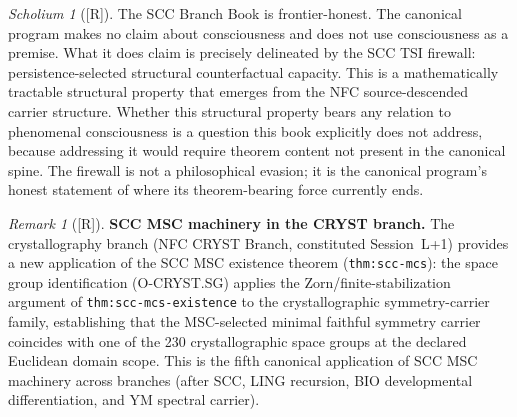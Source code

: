 \documentclass[12pt,oneside]{amsbook}
\theoremstyle{plain}
\theoremstyle{definition}
\theoremstyle{remark}
\newtheorem{remark}[theorem]{Remark}
\newtheorem{scholium}[theorem]{Scholium}
\newcommand{\status}[1]{\textup{[#1]}}
\begin{document}
\begin{scholium}[\status{R}]
The SCC Branch Book is frontier-honest. The canonical program
makes no claim about consciousness and does not use consciousness
as a premise. What it does claim is precisely delineated by the
SCC TSI firewall: persistence-selected structural counterfactual
capacity. This is a mathematically tractable structural property
that emerges from the NFC source-descended carrier structure.
Whether this structural property bears any relation to phenomenal
consciousness is a question this book explicitly does not address,
because addressing it would require theorem content not present
in the canonical spine. The firewall is not a philosophical
evasion; it is the canonical program's honest statement of where
its theorem-bearing force currently ends.
\end{scholium}

\begin{remark}[\status{R}]\label{rem:scc-cryst-connection}
\textbf{SCC MSC machinery in the CRYST branch.}
The crystallography branch (NFC CRYST Branch, constituted
Session~L+1) provides a new application of the SCC MSC
existence theorem (\texttt{thm:scc-mcs}): the space group
identification (O-CRYST.SG) applies the Zorn/finite-stabilization
argument of \texttt{thm:scc-mcs-existence} to the crystallographic
symmetry-carrier family, establishing that the MSC-selected minimal
faithful symmetry carrier coincides with one of the 230 crystallographic
space groups at the declared Euclidean domain scope.  This is the
fifth canonical application of SCC MSC machinery across branches
(after SCC, LING recursion, BIO developmental differentiation,
and YM spectral carrier).
\end{remark}
\end{document}
